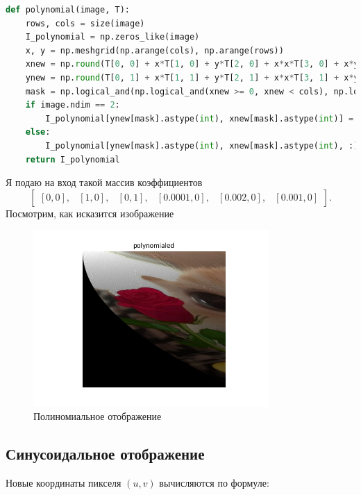\documentclass[a4paper,12pt]{article}
\begin{document}
\begin{lstlisting}[language=Python, caption=Функция полиномиального отображения]
def polynomial(image, T):
    rows, cols = size(image)
    I_polynomial = np.zeros_like(image)
    x, y = np.meshgrid(np.arange(cols), np.arange(rows))
    xnew = np.round(T[0, 0] + x*T[1, 0] + y*T[2, 0] + x*x*T[3, 0] + x*y*T[4, 0] + y*y*T[5, 0]).astype(np.float32)
    ynew = np.round(T[0, 1] + x*T[1, 1] + y*T[2, 1] + x*x*T[3, 1] + x*y*T[4, 1] + y*y*T[5, 1]).astype(np.float32)
    mask = np.logical_and(np.logical_and(xnew >= 0, xnew < cols), np.logical_and(ynew >= 0, ynew < rows))
    if image.ndim == 2:
        I_polynomial[ynew[mask].astype(int), xnew[mask].astype(int)] = image[y[mask], x[mask]]
    else:
        I_polynomial[ynew[mask].astype(int), xnew[mask].astype(int), :] = image[y[mask], x[mask], :]
    return I_polynomial
\end{lstlisting}

Я подаю на вход такой массив коэффициентов
\[
\begin{bmatrix}
[0, 0], & [1, 0], & [0, 1], & [0.0001, 0], & [0.002, 0], & [0.001, 0]
\end{bmatrix}.
\] Посмотрим, как исказится изображение

\begin{figure}[H]
    \centering
    \includegraphics[width=0.8\textwidth]{lab2/task1/Figure_11.png}
    \caption{Полиномиальное отображение}
    \label{fig:my_image}
\end{figure}

\subsection{Синусоидальное отображение}


Новые координаты пикселя \((u, v)\) вычисляются по формуле:
\end{document}
